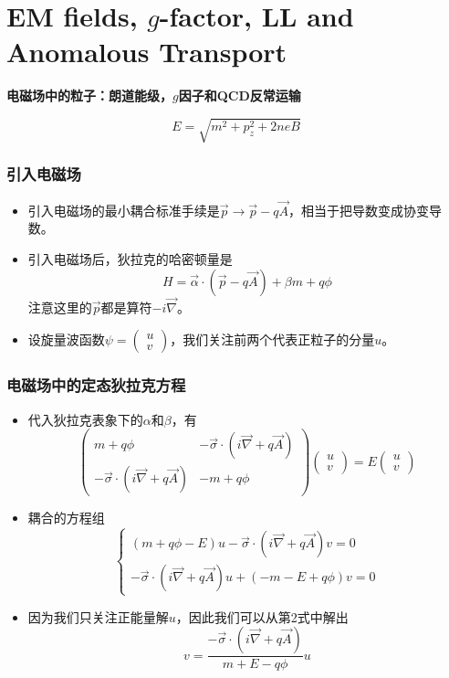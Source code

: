 \documentclass[aspectratio=1610,14pt,matheuler]{beamer}
\newcommand{\bch}{}
\newcommand{\ech}{}
\def\bcenter{\begin{center}}
\def\ecenter{\end{center}}
\def\skipline{{\vskip0.1in}}
\def\tbox#1{\begin{tcolorbox}#1\end{tcolorbox}}
\def\secpage#1#2{\begin{frame}\bch\bcenter{\bf \Huge #1} \skipline \tbox{#2}\ecenter\ech\end{frame}}
\newcommand{\mat}[1]{\begin{pmatrix}#1\end{pmatrix}}
\begin{document}
\section{EM fields, $g$-factor, LL and Anomalous Transport}
\secpage{电磁场中的粒子：朗道能级，$g$因子和QCD反常运输}{$$E = \sqrt{m^2 + p_z^2 + 2neB}$$}
\begin{frame}
\frametitle{\bch 引入电磁场 \ech}
\bch
\begin{itemize}
\item
引入电磁场的最小耦合标准手续是$\vec p \to \vec p - q \vec A$，相当于把导数变成协变导数。
\item
引入电磁场后，狄拉克的哈密顿量是
$$
H = \vec \alpha \cdot (\vec p - q \vec A) + \beta m + q\phi
$$
注意这里的$\vec p$都是算符$-i\vec \nabla$。
\item
设旋量波函数$\psi = \mat{u \\ v}$，我们关注前两个代表正粒子的分量$u$。
\end{itemize}
\ech
\end{frame}

\begin{frame}
\frametitle{\bch 电磁场中的定态狄拉克方程 \ech}
\bch
\begin{itemize}
\item
代入狄拉克表象下的$\alpha$和$\beta$，有
$$
\mat{m + q\phi & -\vec \sigma \cdot( i\vec \nabla + q\vec A) \\ -\vec \sigma \cdot( i\vec \nabla + q\vec A) & -m + q\phi} \mat{u \\ v} = E\mat{u \\v}
$$
\item
耦合的方程组
$$
\begin{cases}
(m + q\phi - E) u - \vec \sigma \cdot( i\vec \nabla + q\vec A) v = 0\\
-\vec \sigma \cdot( i\vec \nabla + q\vec A) u + (-m - E + q\phi)v = 0
\end{cases}
$$
\item 因为我们只关注正能量解$u$，因此我们可以从第2式中解出$$v = \frac{-\vec \sigma \cdot( i\vec \nabla + q\vec A)}{m+E - q\phi}u$$
\end{itemize}
\ech
\end{frame}
\end{document}
